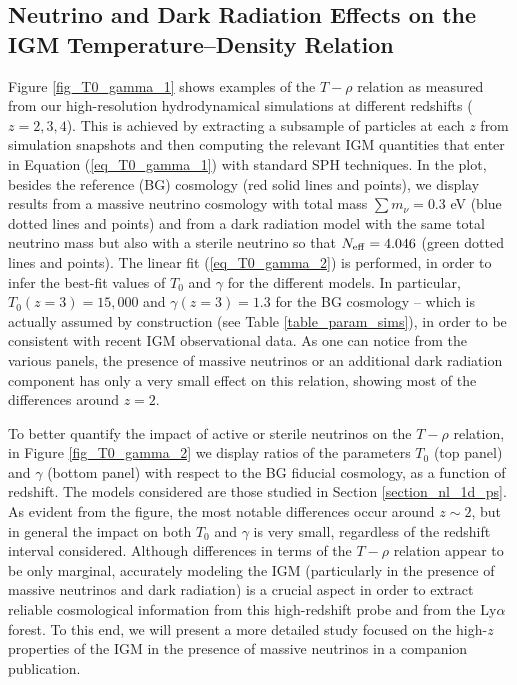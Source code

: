\documentclass{emulateapj}
\begin{document}
\subsection{Neutrino and Dark Radiation Effects on the IGM Temperature--Density Relation}

Figure \ref{fig_T0_gamma_1} shows examples of the $T-\rho$ relation as measured from our high-resolution hydrodynamical simulations
at different redshifts ($z=2,3,4$). 
This is achieved by extracting a subsample of particles at each $z$ from 
simulation snapshots and then computing the relevant IGM quantities that enter in Equation (\ref{eq_T0_gamma_1})
with standard  SPH techniques.
In the plot, besides the reference (BG) cosmology (red solid lines and points), we display results from 
a massive neutrino cosmology with total mass $\sum m_{\nu}=0.3$ eV (blue dotted lines and points)
and from a dark radiation model with the same total neutrino mass but also with a sterile neutrino so that $N_{\rm eff} =4.046$
(green dotted lines and points). The linear fit (\ref{eq_T0_gamma_2}) is performed, in order to infer the best-fit values of $T_0$ and $\gamma$
for the different models. In particular, $T_0(z=3)=15,000$ and $\gamma (z=3) = 1.3$ for the BG cosmology -- which is actually assumed  by construction 
(see Table \ref{table_param_sims}), in order to be consistent with recent IGM observational data.
As one can notice from the various panels,  the presence of massive neutrinos or an additional dark radiation component has only a very small effect on this relation,
showing most of the differences around $z=2$. 

To better quantify the impact of active or sterile neutrinos on the $T-\rho$ relation, in Figure \ref{fig_T0_gamma_2} we display
ratios of the parameters $T_0$ (top panel) and $\gamma$ (bottom panel) with respect to the BG fiducial cosmology,
as a function of redshift. The models considered are those studied in Section \ref{section_nl_1d_ps}. 
As evident from the figure, the most notable differences occur around $z\sim 2$, but in general
the impact on both $T_0$ and $\gamma$ is very small, regardless of the redshift interval considered.
Although differences in terms of the  $T-\rho$ relation appear to be only marginal, 
accurately modeling the IGM (particularly in the presence of massive neutrinos and dark radiation) is a crucial aspect
in order to extract reliable cosmological information from this high-redshift probe and from the Ly$\alpha$ forest. To this end, 
we will present a more detailed study focused on the high-$z$ properties of the IGM in the presence of 
massive neutrinos in a 
companion publication.  
\end{document}
